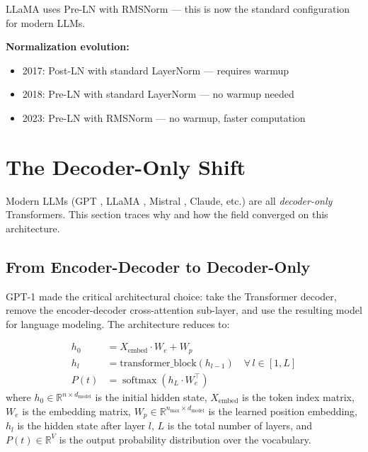 \documentclass[11pt,a4paper]{article}
\newcommand{\R}{\mathbb{R}}
\newcommand{\softmax}{\operatorname{softmax}}
\newcommand{\dmodel}{d_{\text{model}}}
\begin{document}
LLaMA \cite{touvron2023} uses Pre-LN with RMSNorm --- this is now the standard
configuration for modern LLMs.

\begin{evobox}
\textbf{Normalization evolution:}
\begin{itemize}[nosep]
  \item 2017: Post-LN with standard LayerNorm \cite{vaswani2017} --- requires warmup
  \item 2018: Pre-LN with standard LayerNorm \cite{radford2018} --- no warmup needed
  \item 2023: Pre-LN with RMSNorm \cite{touvron2023} --- no warmup, faster computation
\end{itemize}
\end{evobox}


\section{The Decoder-Only Shift}
\label{sec:decoder-only}

Modern LLMs (GPT \cite{radford2018, brown2020}, LLaMA \cite{touvron2023}, Mistral
\cite{jiang2023}, Claude, etc.) are all \emph{decoder-only} Transformers. This section
traces why and how the field converged on this architecture.

\subsection{From Encoder-Decoder to Decoder-Only}

GPT-1 \cite{radford2018} made the critical architectural choice: take the Transformer
decoder, remove the encoder-decoder cross-attention sub-layer, and use the resulting model
for language modeling. The architecture reduces to:

\begin{align}
  h_0 &= X_{\text{embed}} \cdot W_e + W_p \\
  h_l &= \text{transformer\_block}(h_{l-1}) \quad \forall\, l \in [1, L] \\
  P(t) &= \softmax(h_L \cdot W_e^\top)
\end{align}
where $h_0 \in \R^{n \times \dmodel}$ is the initial hidden state,
$X_{\text{embed}}$ is the token index matrix, $W_e$ is the embedding matrix,
$W_p \in \R^{n_{\max} \times \dmodel}$ is the learned position embedding,
$h_l$ is the hidden state after layer $l$, $L$ is the total number of layers,
and $P(t) \in \R^V$ is the output probability distribution over the vocabulary.
\end{document}
